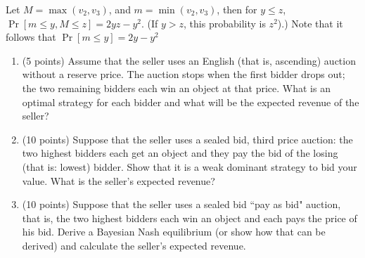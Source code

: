 \documentclass[a4paper]{article}
\begin{document}
Let $M = \max(v_{2},v_{3})$, and $m = \min (v_{2},v_{3})$, then for $y\leq z$, $\Pr[m\leq y,M\leq z]=2yz-y^{2}$. (If $y>z$, this probability is $z^2$).) Note that it follows that $\Pr[m \leq y] = 2y - y^{2}$
\begin{enumerate}
	\item (5 points) Assume that the seller uses an English (that is, ascending) auction without a reserve price. The auction stops when the first bidder drops out; the two remaining bidders each win an object at that price. What is an optimal strategy for each bidder and what will be the expected revenue of the seller?
	\item (10 points) Suppose that the seller uses a sealed bid, third price auction: the two highest bidders each get an object and they pay the bid of the losing (that is: lowest) bidder. Show that it is a weak dominant strategy to bid your value. What is the seller’s expected revenue?
	\item (10 points) Suppose that the seller uses a sealed bid ``pay as bid" auction, that is, the two highest bidders each win an object and each pays the price of his bid. Derive a Bayesian Nash equilibrium (or show how that can be derived) and calculate the seller's expected revenue.
\end{enumerate}
\end{document}
